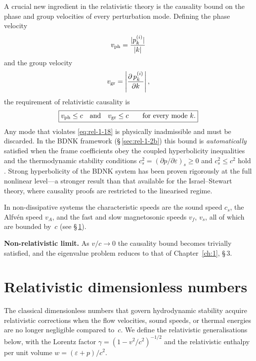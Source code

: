 A crucial new ingredient in the relativistic theory is the causality
bound on the phase and group velocities of every perturbation mode.
Defining the phase velocity
\begin{equation}
\label{eq:rel-1-16}
v_{\rm ph} = \frac{|p_{\mathbf{k}}^{(i)}|}{|\mathbf{k}|}
\end{equation}
and the group velocity
\begin{equation}
\label{eq:rel-1-17}
v_{\rm gr} = \left|
  \frac{\partial\,p_{\mathbf{k}}^{(i)}}{\partial \mathbf{k}}
\right|,
\end{equation}
the requirement of relativistic causality is
\begin{equation}
\label{eq:rel-1-18}
\boxed{v_{\rm ph}\leq c \quad\text{and}\quad v_{\rm gr}\leq c
  \qquad\text{for every mode } \mathbf{k}.}
\end{equation}
Any mode that violates \eqref{eq:rel-1-18} is physically inadmissible
and must be discarded.  In the BDNK framework
(\S\,\ref{sec:rel-1-2b}) this bound is \emph{automatically}
satisfied when the frame coefficients obey the coupled hyperbolicity
inequalities and the thermodynamic stability conditions
$c_{s}^{2}=(\partial p/\partial\varepsilon)_{s}\geq 0$ and
$c_{s}^{2}\leq c^{2}$ hold \cite{BemficaDN2018,Kovtun2019}.  Strong
hyperbolicity of the BDNK system has been proven rigorously at the
full nonlinear level---a stronger result than that available for the
Israel--Stewart theory, where causality proofs are restricted to the
linearised regime.

In non-dissipative systems the characteristic speeds are the sound
speed $c_s$, the Alfv\'en speed $v_A$, and the fast and slow
magnetosonic speeds $v_f$, $v_s$, all of which are bounded by~$c$
(see \S\,\ref{sec:rel-1-4}).

\noindent\textbf{Non-relativistic limit.}  As $v/c\to 0$ the
causality bound becomes trivially satisfied, and the eigenvalue
problem reduces to that of Chapter~\ref{ch:1}, \S\,3.

\section{Relativistic dimensionless numbers}
\label{sec:rel-1-4}

The classical dimensionless numbers that govern hydrodynamic stability
acquire relativistic corrections when the flow velocities, sound
speeds, or thermal energies are no longer negligible compared to~$c$.
We define the relativistic generalisations below, with the Lorentz
factor $\gamma=(1-v^{2}/c^{2})^{-1/2}$ and the relativistic enthalpy
per unit volume $w=(\varepsilon+p)/c^{2}$.

